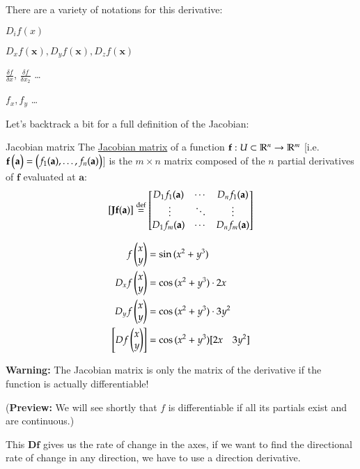 There are a variety of notations for this derivative:
\begin{itemize}
\begin{minipage}{0.5\linewidth}
  \item $D_i f(x)$
  \item $D_x f(\bm{x}), D_y f(\bm{x}), D_z f(\bm{x})$
\end{minipage}\begin{minipage}{0.5\linewidth}
  \item $\frac{\delta f}{\delta x}$, $\frac{\delta f}{\delta x_2}$ \dots
  \item $f_x, f_y$ \dots
  \end{minipage}
\end{itemize}

Let's backtrack a bit for a full definition of the Jacobian: 
\begin{defn}{Jacobian matrix}
	The \ul{Jacobian matrix} of a function $\textbf{f} : U\subset \mathbb{R}^n\to \mathbb{R}^m$ [i.e. $\textbf{f}\begin{pmatrix} \textbf{a} \end{pmatrix} = \begin{pmatrix} f_1(\textbf{a}),\dots,f_n(\textbf{a}) \end{pmatrix}$] is the $m \times n$ matrix composed of the $n$ partial derivatives of $\bm{f}$ evaluated at $\bm{a}$: 
	\[[\textbf{Jf}(\textbf{a})] \overset{\mathrm{def}}{=} \begin{bmatrix} D_1f_1(\textbf{a}) & \cdots & D_nf_1(\textbf{a}) \\ \ \vdots & \ddots & \vdots \\ D_1f_m(\textbf{a}) & \cdots & D_nf_m(\textbf{a}) \end{bmatrix}\]
\end{defn}


\example
\begin{align*}
  f\begin{pmatrix} x \\ y \end{pmatrix} &= \sin{(x^2+y^3)} \\
  D_x f\begin{pmatrix} x \\ y \end{pmatrix} &= \cos{(x^2 + y^3)}\cdot 2x \\
  D_y f\begin{pmatrix} x \\ y \end{pmatrix} &= \cos{(x^2 + y^3)}\cdot 3y^2 \\
  \left[Df\begin{pmatrix} x \\ y \end{pmatrix}\right] &= \cos{(x^2 + y^3) [2x \quad 3y^2]}
\end{align*}

\textbf{Warning:} The Jacobian matrix is only the matrix of the derivative if the function is actually differentiable!

(\textbf{Preview:} We will see shortly that $f$ is differentiable if all its partials exist and are continuous.)

This $\bm{Df}$ gives us the rate of change in the axes, if we want to find the directional rate of change in any direction, we have to use a direction derivative.

